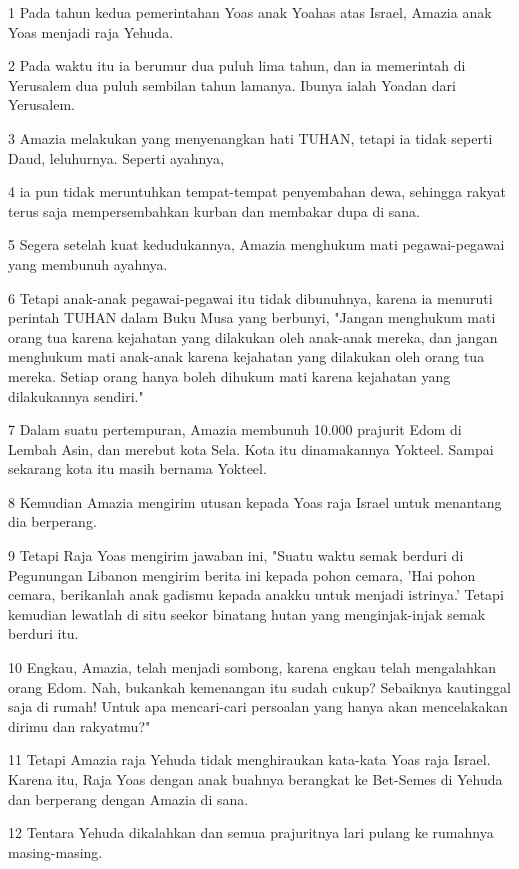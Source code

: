 \par 1 Pada tahun kedua pemerintahan Yoas anak Yoahas atas Israel, Amazia anak Yoas menjadi raja Yehuda.
\par 2 Pada waktu itu ia berumur dua puluh lima tahun, dan ia memerintah di Yerusalem dua puluh sembilan tahun lamanya. Ibunya ialah Yoadan dari Yerusalem.
\par 3 Amazia melakukan yang menyenangkan hati TUHAN, tetapi ia tidak seperti Daud, leluhurnya. Seperti ayahnya,
\par 4 ia pun tidak meruntuhkan tempat-tempat penyembahan dewa, sehingga rakyat terus saja mempersembahkan kurban dan membakar dupa di sana.
\par 5 Segera setelah kuat kedudukannya, Amazia menghukum mati pegawai-pegawai yang membunuh ayahnya.
\par 6 Tetapi anak-anak pegawai-pegawai itu tidak dibunuhnya, karena ia menuruti perintah TUHAN dalam Buku Musa yang berbunyi, "Jangan menghukum mati orang tua karena kejahatan yang dilakukan oleh anak-anak mereka, dan jangan menghukum mati anak-anak karena kejahatan yang dilakukan oleh orang tua mereka. Setiap orang hanya boleh dihukum mati karena kejahatan yang dilakukannya sendiri."
\par 7 Dalam suatu pertempuran, Amazia membunuh 10.000 prajurit Edom di Lembah Asin, dan merebut kota Sela. Kota itu dinamakannya Yokteel. Sampai sekarang kota itu masih bernama Yokteel.
\par 8 Kemudian Amazia mengirim utusan kepada Yoas raja Israel untuk menantang dia berperang.
\par 9 Tetapi Raja Yoas mengirim jawaban ini, "Suatu waktu semak berduri di Pegunungan Libanon mengirim berita ini kepada pohon cemara, 'Hai pohon cemara, berikanlah anak gadismu kepada anakku untuk menjadi istrinya.' Tetapi kemudian lewatlah di situ seekor binatang hutan yang menginjak-injak semak berduri itu.
\par 10 Engkau, Amazia, telah menjadi sombong, karena engkau telah mengalahkan orang Edom. Nah, bukankah kemenangan itu sudah cukup? Sebaiknya kautinggal saja di rumah! Untuk apa mencari-cari persoalan yang hanya akan mencelakakan dirimu dan rakyatmu?"
\par 11 Tetapi Amazia raja Yehuda tidak menghiraukan kata-kata Yoas raja Israel. Karena itu, Raja Yoas dengan anak buahnya berangkat ke Bet-Semes di Yehuda dan berperang dengan Amazia di sana.
\par 12 Tentara Yehuda dikalahkan dan semua prajuritnya lari pulang ke rumahnya masing-masing.
